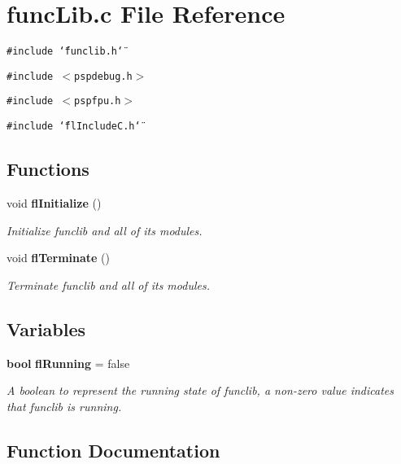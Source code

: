 \section{func\-Lib.c File Reference}
\label{funcLib_8c}
{\tt \#include \char`\"{}funclib.h\char`\"{}}\par
{\tt \#include $<$pspdebug.h$>$}\par
{\tt \#include $<$pspfpu.h$>$}\par
{\tt \#include \char`\"{}fl\-Include\-C.h\char`\"{}}\par
\subsection*{Functions}
\begin{CompactItemize}
\item 
void {\bf fl\-Initialize} ()
\begin{CompactList}\small\item\em Initialize funclib and all of its modules. \item\end{CompactList}\item 
void {\bf fl\-Terminate} ()
\begin{CompactList}\small\item\em Terminate funclib and all of its modules. \item\end{CompactList}\end{CompactItemize}
\subsection*{Variables}
\begin{CompactItemize}
\item 
{\bf bool} {\bf fl\-Running} = false
\begin{CompactList}\small\item\em A boolean to represent the running state of funclib, a non-zero value indicates that funclib is running. \item\end{CompactList}\end{CompactItemize}


\subsection{Function Documentation}
